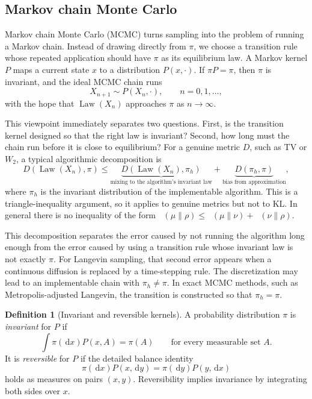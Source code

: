 \documentclass{amsart}
\numberwithin{equation}{section}
\theoremstyle{plain}
\theoremstyle{definition}
\newtheorem{defn}[theorem]{Definition}
\theoremstyle{remark}
\DeclareMathOperator{\KL}{D_{\mathsf{KL}}}
\DeclareMathOperator{\Law}{Law}
\newcommand{\dd}{\,\mathrm{d}}
\begin{document}
\subsection{Markov chain Monte Carlo}

Markov chain Monte Carlo (MCMC) turns sampling into the problem of running a
Markov chain.  Instead of drawing directly from $\pi$, we choose a transition
rule whose repeated application should have $\pi$ as its equilibrium law.  A
Markov kernel $P$ maps a current state $x$ to a distribution $P(x,\cdot)$.  If
$\pi P=\pi$, then $\pi$ is invariant, and the ideal MCMC chain runs
\[
    X_{n+1}\sim P(X_n,\cdot),\qquad n=0,1,\ldots,
\]
with the hope that $\Law(X_n)$ approaches $\pi$ as $n\to\infty$.

This viewpoint immediately separates two questions.  First, is the transition
kernel designed so that the right law is invariant?  Second, how long must the
chain run before it is close to equilibrium?  For a genuine metric $D$, such as
TV or $W_2$, a typical algorithmic decomposition is
\[
    D(\Law(X_n),\pi)
    \leq
    \underbrace{D(\Law(X_n),\pi_h)}_{\text{mixing to the algorithm's invariant law}}
    +
    \underbrace{D(\pi_h,\pi)}_{\text{bias from approximation}},
\]
where $\pi_h$ is the invariant distribution of the implementable algorithm.
This is a triangle-inequality argument, so it applies to genuine metrics but
not to KL\@.  In general there is no inequality of the form
$\KL(\mu\|\rho)\leq\KL(\mu\|\nu)+\KL(\nu\|\rho)$.



This decomposition separates the error caused by not running the algorithm long
enough from the error caused by using a transition rule whose invariant law is
not exactly $\pi$.  For Langevin sampling, that second error appears when a
continuous diffusion is replaced by a time-stepping rule.  The discretization
may lead to an implementable chain with $\pi_h\neq\pi$.  In exact MCMC methods,
such as Metropolis-adjusted Langevin, the transition is constructed so that
$\pi_h=\pi$.

\begin{defn}[Invariant and reversible kernels]
A probability distribution $\pi$ is \emph{invariant} for $P$ if
\[
    \int \pi(\dd x)P(x,A)=\pi(A)
    \qquad\text{for every measurable set }A.
\]
It is \emph{reversible} for $P$ if the detailed balance identity
\[
    \pi(\dd x)P(x,\dd y)=\pi(\dd y)P(y,\dd x)
\]
holds as measures on pairs $(x,y)$.  Reversibility implies invariance by
integrating both sides over $x$.
\end{defn}
\end{document}
